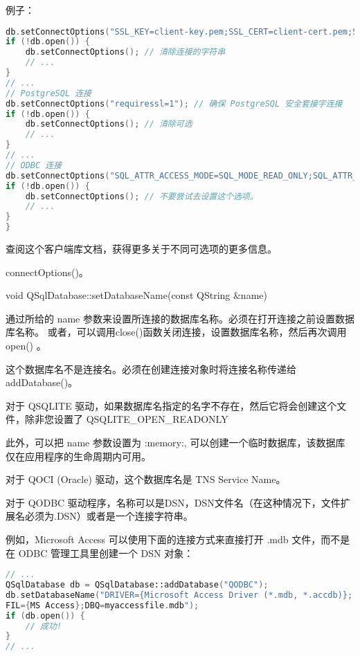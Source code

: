 \clearpage

例子：

\begin{lstlisting}[language=C++]
db.setConnectOptions("SSL_KEY=client-key.pem;SSL_CERT=client-cert.pem;SSL_CA=ca-cert.pem;CLIENT_IGNORE_SPACE=1"); // 使用安全套连字进行连接
if (!db.open()) {
	db.setConnectOptions(); // 清除连接的字符串
	// ...
}
// ...
// PostgreSQL 连接
db.setConnectOptions("requiressl=1"); // 确保 PostgreSQL 安全套接字连接
if (!db.open()) {
	db.setConnectOptions(); // 清除可选
	// ...
}
// ...
// ODBC 连接
db.setConnectOptions("SQL_ATTR_ACCESS_MODE=SQL_MODE_READ_ONLY;SQL_ATTR_TRACE=SQL_OPT_TRACE_ON"); // 设置 ODBC 连项
if (!db.open()) {
	db.setConnectOptions(); // 不要尝试去设置这个选项。
	// ...
}
}
\end{lstlisting}

查阅这个客户端库文档，获得更多关于不同可选项的更多信息。

\begin{notice}[另请查阅]
connectOptions()。
\end{notice}



void QSqlDatabase::setDatabaseName(const QString \&name)

通过所给的 name 参数来设置所连接的数据库名称。必须在打开连接之前设置数据库名称。 或者，可以调用close()函数关闭连接，设置数据库名称，然后再次调用open() 。

\begin{notice}
这个数据库名不是连接名。必须在创建连接对象时将连接名称传递给 addDatabase()。
\end{notice}


对于 QSQLITE 驱动，如果数据库名指定的名字不存在，然后它将会创建这个文件，除非您设置了 QSQLITE\_OPEN\_READONLY

此外，可以把 name 参数设置为 :memory:, 可以创建一个临时数据库，该数据库仅在应用程序的生命周期内可用。

对于 QOCI (Oracle) 驱动，这个数据库名是 TNS Service Name。

对于 QODBC 驱动程序，名称可以是DSN，DSN文件名（在这种情况下，文件扩展名必须为.DSN）或者是一个连接字符串。

例如，Microsoft Access 可以使用下面的连接方式来直接打开 .mdb 文件，而不是在 ODBC 管理工具里创建一个 DSN 对象：

\clearpage

\begin{lstlisting}[language=C++]
// ...
QSqlDatabase db = QSqlDatabase::addDatabase("QODBC");
db.setDatabaseName("DRIVER={Microsoft Access Driver (*.mdb, *.accdb)};
FIL={MS Access};DBQ=myaccessfile.mdb");
if (db.open()) {
	// 成功!
}
// ...
\end{lstlisting}

